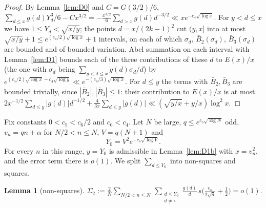 \documentclass[11pt]{amsart}
\newtheorem{lemma}{Lemma}
\theoremstyle{remark}
\begin{document}
\begin{proof}
By Lemma~\ref{lem:D0} and $C=G(3/2)/6$, $\sum_{d\le x}g(d)Y_d^3/6-Cx^{3/2}=-\frac{x^{3/2}}6\sum_{d>x}g(d)d^{-3/2}\ll xe^{-c_4\sqrt{\log x}}$. For $y<d\le x$ we have $1\le Y_d<\sqrt{x/y}$; the points $d=x/(2k-1)^2$ cut $(y,x]$ into at most $\sqrt{x/y}+1\le e^{(c_4/2)\sqrt{\log x}}+1$ intervals, on each of which $\sigma_d$, $\bar B_2(\sigma_d)$, $\bar B_3(\sigma_d)$ are bounded and of bounded variation. Abel summation on each interval with Lemma~\ref{lem:D1} bounds each of the three contributions of these $d$ to $E(x)/x$ (the one with $\sigma_d$ being $\sum_{y<d\le x}g(d)\sigma_d/d$) by $e^{(c_4/2)\sqrt{\log x}-c_4\sqrt{\log y}}\ll e^{-(c_4/3)\sqrt{\log x}}$. For $d\le y$ the terms with $\bar B_2,\bar B_3$ are bounded trivially, since $|\bar B_2|,|\bar B_3|\le1$: their contribution to $E(x)/x$ is at most $2x^{-1/2}\sum_{d\le y}|g(d)|d^{-1/2}+\frac4{3x}\sum_{d\le y}|g(d)|\ll(\sqrt{y/x}+y/x)\log^2x$.
\end{proof}

Fix constants $0<c_5<c_6/2$ and $c_6<c_4$. Let $N$ be large, $q\le e^{c_5\sqrt{\log N}}$ odd, $v_n=qn+\alpha$ for $N/2<n\le N$, $V=q(N+1)$ and
\[
Y_0=V^2e^{-c_6\sqrt{\log V}}.
\]
For every $n$ in this range, $y=Y_0$ is admissible in Lemma~\ref{lem:D1b} with $x=v_n^2$, and the error term there is $o(1)$. We split $\sum_{d\le Y_0}$ into non-squares and squares.

\begin{lemma}[non-squares]\label{lem:D2}
$\displaystyle\Sigma_2:=\frac2N\sum_{N/2<n\le N}\ \sum_{\substack{d\le Y_0\\ d\neq\square}}\frac{g(d)}d\,s\Big(\frac{v_n}{2\sqrt d}+\frac12\Big)=o(1).$
\end{lemma}
\end{document}
